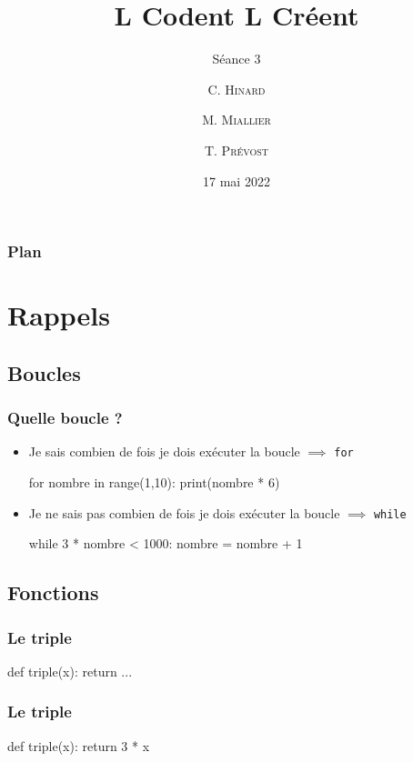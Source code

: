 \documentclass{beamer}
\title %
{L Codent L Créent}
\subtitle{Séance 3}
\author[ENSTA Bretagne] %
{C. \textsc{Hinard} \and M. \textsc{Miallier} \and T. \textsc{Prévost}}
\institute[] %
{
  ENSTA Bretagne
  \and
  Collège Croas ar Pennoc
}
\date[Séance 3] %
{17 mai 2022}
\begin{document}
\frame{\titlepage}


\begin{frame}
\frametitle{Plan}
\tableofcontents
\end{frame}

\section{Rappels}\label{sec:rappels}
   \subsection{Boucles}\label{subsec:boucles}
\begin{frame}[fragile]
   \frametitle{Quelle boucle ?}

   \begin{itemize}
      \item Je sais combien de fois je dois exécuter la boucle $\implies$ \texttt{for} \pause
      \begin{pyverbatim}
   for nombre in range(1,10):
      print(nombre * 6)
      \end{pyverbatim}
      \pause
      \item Je ne sais pas combien de fois je dois exécuter la boucle $\implies$ \texttt{while} \pause
      \begin{pyverbatim}
   while 3 * nombre < 1000:
      nombre = nombre + 1
      \end{pyverbatim}
   \end{itemize}
\end{frame}


   \subsection{Fonctions}\label{subsec:fonctions}

\begin{frame}[fragile]
   \frametitle{Le triple}

   \begin{pyverbatim}
         def triple(x):
            return ...
   \end{pyverbatim}
\end{frame}

\begin{frame}[fragile]
   \frametitle{Le triple}

   \begin{pyverbatim}
         def triple(x):
            return 3 * x
   \end{pyverbatim}
\end{frame}
\end{document}
